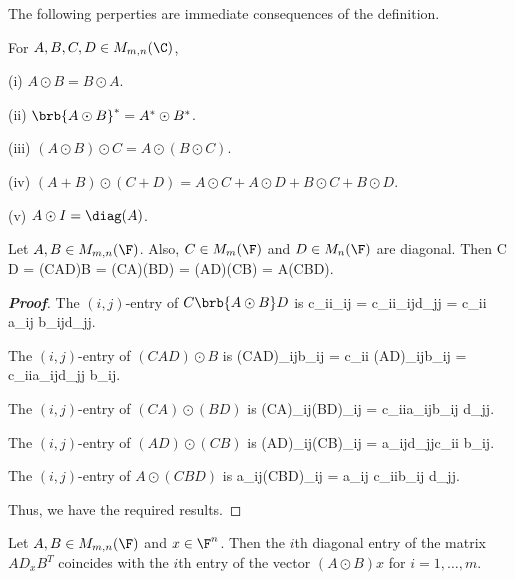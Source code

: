 The following perperties are immediate consequences of the definition.

\begin{proposition}\label{pro:hadamard_product_basic_properties}
For $A,B,C,D\in M_{m,n}(\C)$,
\ben
\item [(i)] $A\odot B = B \odot A$.
\item [(ii)] $\brb{A\odot B}^* = A^* \odot B^*$.
\item [(iii)] $(A\odot B)\odot C = A\odot (B\odot C)$.
\item [(iv)] $(A+B)\odot (C+D) = A\odot C+A\odot D+B\odot C+B\odot D$.
\item [(v)] $A\odot I = \diag(A)$.
\een
\end{proposition}


\begin{lemma}\label{lem:hadamard_product_commute}
Let $A,B\in M_{m,n}(\F)$. Also, $C\in M_m(\F)$ and $D \in M_n(\F)$ are diagonal. Then
\be
C D = (CAD)\odot B = (CA)\odot(BD) = (AD)\odot (CB) = A\odot (CBD).
\ee
\end{lemma}

\begin{proof}[\bf Proof]
The $(i,j)$-entry of $C\brb{A\odot B} D$ is
\be
c_{ii}_{ij} = c_{ii}_{ij}d_{jj} = c_{ii} a_{ij} b_{ij}d_{jj}.
\ee

The $(i,j)$-entry of $(CAD)\odot B$ is
\be
(CAD)_{ij}b_{ij} = c_{ii} (AD)_{ij}b_{ij} = c_{ii}a_{ij}d_{jj} b_{ij}.
\ee

The $(i,j)$-entry of $(CA)\odot(BD)$ is
\be
(CA)_{ij}(BD)_{ij} = c_{ii}a_{ij}b_{ij} d_{jj}.
\ee

The $(i,j)$-entry of $(AD)\odot (CB)$ is
\be
(AD)_{ij}(CB)_{ij} = a_{ij}d_{jj}c_{ii} b_{ij}.
\ee

The $(i,j)$-entry of $A\odot (CBD)$ is
\be
a_{ij}(CBD)_{ij} = a_{ij} c_{ii}b_{ij} d_{jj}.
\ee

Thus, we have the required results.
\end{proof}



\begin{lemma}\label{lem:hadamard_product_diagonal_entry_equals_vector_entry}
Let $A,B\in M_{m,n}(\F)$ and $x\in \F^n$. Then the $i$th diagonal entry of the matrix $AD_xB^T$ coincides with the $i$th entry of the vector $(A\odot B)x$ for $i = 1,\dots,m$.
\end{lemma}

